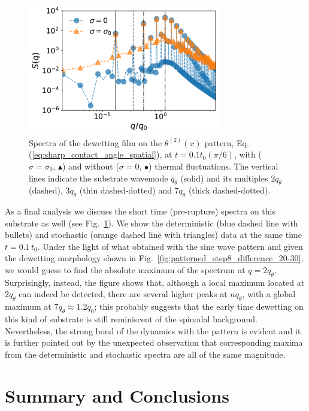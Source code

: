  \begin{figure}
     \centering
     \includegraphics[width=0.75\textwidth]{graphics/square_wave_det_stoch.pdf}
     \caption{Spectra of the dewetting film on the $\theta^{(2)}(x)$ pattern, Eq.(\ref{eq:sharp_contact_angle_spatial}), at $t = 0.1t_0(\pi/6)$, with ($\sigma = \sigma_0$, \textcolor{pyorange}{$\blacktriangle$}) and without ($\sigma =0$, \textcolor{pyblue}{$\bullet$}) thermal fluctuations. 
     The vertical lines indicate the substrate wavemode $q_{\theta}$ (solid) and its multiples $2q_{\theta}$ (dashed), $3q_{\theta}$ (thin dashed-dotted) and $7q_{\theta}$ (thick dashed-dotted).}
     \label{fig:square_wave_both}
 \end{figure}
As a final analysis we discuss the short time (pre-rupture) spectra on this substrate as well (see Fig.~\ref{fig:square_wave_both}).
We show the deterministic (blue dashed line with bullets) and stochastic (orange dashed line with triangles) data at the same time $t=0.1\,t_0$.
Under the light of what obtained with the sine wave pattern and given the dewetting morphology shown in Fig.~\ref{fig:patterned_step8_difference_20-30}, we would guess to find the absolute maximum of the spectrum at $q=2 q_{\theta}$.
Surprisingly, instead, the figure shows that, although a local maximum located at $2q_{\theta}$ can indeed be detected, there are several higher peaks at $n q_{\theta}$, with a global maximum at $7q_{\theta} \approx 1.2 q_0$; this probably suggests that the early time dewetting on this kind of substrate is still reminiscent of the spinodal background. 
Nevertheless, the strong bond of the dynamics with the pattern is evident and it is further pointed out by the unexpected observation that corresponding maxima from the deterministic and stochastic spectra are all of the same magnitude.

\section{Summary and Conclusions}\label{sec:sum_conclu}

